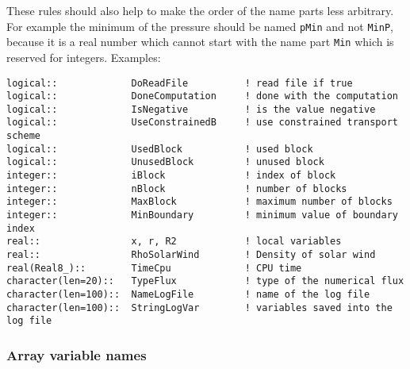 \documentclass{article}
\begin{document}
These rules should also help to make the order of the name parts
less arbitrary. For example the minimum of the pressure should
be named {\tt pMin} and not {\tt MinP}, because it is a real
number which cannot start with the name part {\tt Min} which 
is reserved for integers.
Examples:
\begin{verbatim}
logical::             DoReadFile          ! read file if true
logical::             DoneComputation     ! done with the computation
logical::             IsNegative          ! is the value negative
logical::             UseConstrainedB     ! use constrained transport scheme
logical::             UsedBlock           ! used block
logical::             UnusedBlock         ! unused block
integer::             iBlock              ! index of block
integer::             nBlock              ! number of blocks
integer::             MaxBlock            ! maximum number of blocks
integer::             MinBoundary         ! minimum value of boundary index
real::                x, r, R2            ! local variables
real::                RhoSolarWind        ! Density of solar wind
real(Real8_)::        TimeCpu             ! CPU time 
character(len=20)::   TypeFlux            ! type of the numerical flux
character(len=100)::  NameLogFile         ! name of the log file
character(len=100)::  StringLogVar        ! variables saved into the log file
\end{verbatim}

\subsubsection{Array variable names}
\end{document}
